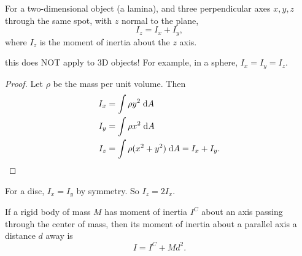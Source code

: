 \documentclass[a4paper]{article}
\begin{document}
\begin{thm}
  For a two-dimensional object (a lamina), and three perpendicular axes $x, y, z$ through the same spot, with $z$ normal to the plane,
  \[
    I_z = I_x + I_y,
  \]
  where $I_z$ is the moment of inertia about the $z$ axis.

  \begin{center}
  \end{center}
\end{thm}
\note this does NOT apply to 3D objects! For example, in a sphere, $I_x = I_y = I_z$.

\begin{proof}
  Let $\rho$ be the mass per unit volume. Then
  \begin{align*}
    I_x &= \int \rho y^2 \;\mathrm{d} A\\
    I_y &= \int \rho x^2 \;\mathrm{d} A\\
    I_z &= \int \rho (x^2 + y^2)\;\mathrm{d} A = I_x + I_y.
  \end{align*}
\end{proof}

\begin{eg}
  For a disc, $I_x = I_y$ by symmetry. So $I_z = 2 I_x$.
\end{eg}

\begin{thm}
  If a rigid body of mass $M$ has moment of inertia $I^C$ about an axis passing through the center of mass, then its moment of inertia about a parallel axis a distance $d$ away is
  \[
    I = I^C + Md^2.
  \]
  \begin{center}
  \end{center}
\end{thm}
\end{document}
